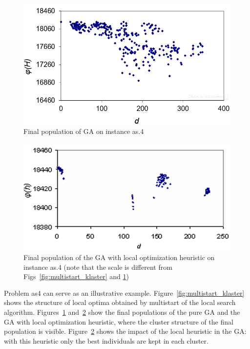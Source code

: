 \documentclass{ifacconf}
\begin{document}
 \begin{figure}[h!]
	\centering
	\includegraphics[scale=0.5]{ga_klaster}
  \caption{Final population of GA on instance as.4} \label{fig:ga_klaster}
  \end{figure}
 \begin{figure}[h!]
	\centering
	\includegraphics[scale=0.5]{gals_klaster}
  \caption{Final population of the GA with local optimization heuristic on instance as.4 \label{fig:gals_klaster} (note that the scale is different from 
  Figs~\ref{fig:multistart_klaster} and \ref{fig:ga_klaster})}
  \end{figure}

Problem as4 can serve as an illustrative example. Figure~\ref{fig:multistart_klaster} shows the structure 
of local optima obtained by multistart  of the local search algorithm. 
Figures~\ref{fig:ga_klaster} and~\ref{fig:gals_klaster} show the final populations of the pure GA and the GA 
with local optimization heuristic, where the cluster structure of the final population is visible. 
Figure~\ref{fig:gals_klaster} shows the impact of the local heuristic in the GA: with this heuristic only the best individuals are kept 
in each cluster.

%
%
%
%

   
                                                  
\end{document}
